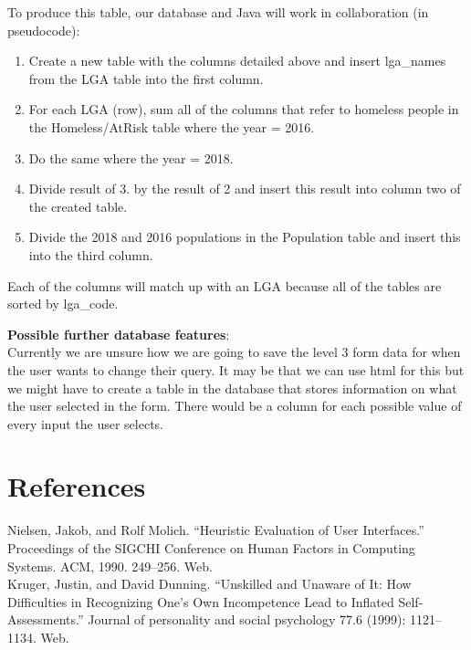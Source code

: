 \documentclass[12pt, a4paper]{article}
\begin{document}
To produce this table, our database and Java will work in collaboration (in pseudocode):
\begin{enumerate}
\item Create a new table with the columns detailed above and insert lga\_names from the LGA table into the first column.
\item For each LGA (row), sum all of the columns that refer to homeless people in the Homeless/AtRisk table where the year = 2016.
\item Do the same where the year = 2018.
\item Divide result of 3. by the result of 2 and insert this result into column two of the created table.
\item Divide the 2018 and 2016 populations in the Population table and insert this into the third column.
\end{enumerate}
Each of the columns will match up with an LGA because all of the tables are sorted by lga\_code. 

\textbf{Possible further database features}: \\
Currently we are unsure how we are going to save the level 3 form data for when the user wants to change their query. It may be that we can use html for this but we might have to create a table in the database that stores information on what the user selected in the form. There would be a column for each possible value of every input the user selects. \\

\section{References}

Nielsen, Jakob, and Rolf Molich. “Heuristic Evaluation of User Interfaces.” Proceedings of the SIGCHI Conference on Human Factors in Computing Systems. ACM, 1990. 249–256. Web. \\

Kruger, Justin, and David Dunning. “Unskilled and Unaware of It: How Difficulties in Recognizing One’s Own Incompetence Lead to Inflated Self-Assessments.” Journal of personality and social psychology 77.6 (1999): 1121–1134. Web.
\end{document}
